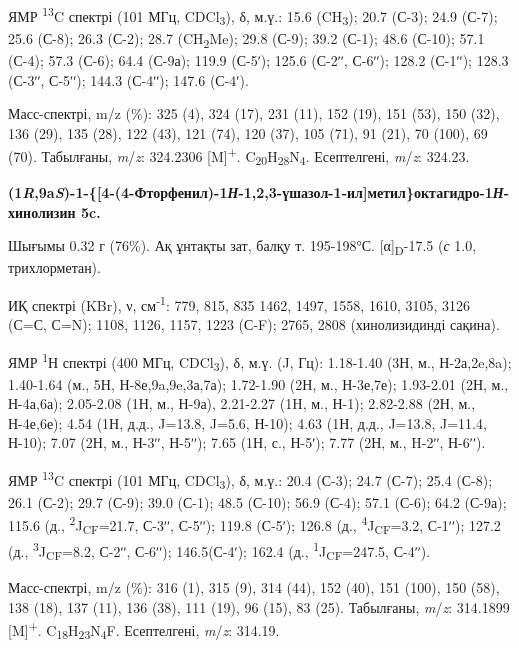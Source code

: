 ЯМР \textsuperscript{13}C спектрі (101 МГц, CDCl\textsubscript{3}), δ,
м.ү.: 15.6 (CH\textsubscript{3}); 20.7 (С-3); 24.9 (С-7); 25.6 (С-8);
26.3 (С-2); 28.7 (CH\textsubscript{2}Me); 29.8 (С-9); 39.2 (С-1); 48.6
(С-10); 57.1 (С-4); 57.3 (С-6); 64.4 (С-9а); 119.9 (С-5ʹ); 125.6 (С-2ʹʹ,
С-6ʹʹ); 128.2 (С-1ʹʹ); 128.3 (С-3ʹʹ, С-5ʹʹ); 144.3 (С-4ʹʹ); 147.6
(С-4ʹ).

Масс-спектрі, m/z (\%): 325 (4), 324 (17), 231 (11), 152 (19), 151 (53),
150 (32), 136 (29), 135 (28), 122 (43), 121 (74), 120 (37), 105 (71), 91
(21), 70 (100), 69 (70). Табылғаны, \emph{m}/\emph{z}: 324.2306
{[}M{]}\textsuperscript{+}.
C\textsubscript{20}H\textsubscript{28}N\textsubscript{4}. Есептелгені,
\emph{m}/\emph{z}: 324.23.

\textbf{(1\emph{R},9a\emph{S})-1-\{{[}4-(4-Фторфенил)-1\emph{Н}-1,2,3-үшазол-1-ил{]}метил\}октагидро-1\emph{Н}-хинолизин
5c.}

Шығымы 0.32 г (76\%). Ақ ұнтақты зат, балқу т. 195-198°С.
{[}α{]}\textsubscript{D}-17.5 (\emph{с} 1.0, трихлорметан).

ИҚ спектрі (KBr), ν, см\textsuperscript{-1}: 779, 815, 835 1462, 1497,
1558, 1610, 3105, 3126 (С=С, С=N); 1108, 1126, 1157, 1223 (С-F); 2765,
2808 (хинолизидинді сақина).

ЯМР \textsuperscript{1}Н спектрі (400 МГц, CDCl\textsubscript{3}), δ,
м.ү. (J, Гц): 1.18-1.40 (3Н, м., Н-2а,2e,8a); 1.40-1.64 (м., 5Н,
Н-8е,9a,9e,3а,7а); 1.72-1.90 (2Н, м., Н-3е,7е); 1.93-2.01 (2Н, м.,
Н-4а,6а); 2.05-2.08 (1Н, м., Н-9а), 2.21-2.27 (1H, м., Н-1); 2.82-2.88
(2Н, м., Н-4е,6е); 4.54 (1Н, д.д., J=13.8, J=5.6, Н-10); 4.63 (1Н, д.д.,
J=13.8, J=11.4, Н-10); 7.07 (2Н, м., Н-3ʹʹ, Н-5ʹʹ); 7.65 (1Н, с., Н-5ʹ);
7.77 (2Н, м., H-2ʹʹ, Н-6ʹʹ).

ЯМР \textsuperscript{13}C спектрі (101 МГц, CDCl\textsubscript{3}), δ,
м.ү.: 20.4 (С-3); 24.7 (С-7); 25.4 (С-8); 26.1 (С-2); 29.7 (С-9); 39.0
(С-1); 48.5 (С-10); 56.9 (С-4); 57.1 (С-6); 64.2 (С-9а); 115.6 (д.,
\textsuperscript{2}J\textsubscript{CF}=21.7, С-3ʹʹ, С-5ʹʹ); 119.8
(С-5ʹ); 126.8 (д., \textsuperscript{4}J\textsubscript{CF}=3.2, С-1ʹʹ);
127.2 (д., \textsuperscript{3}J\textsubscript{CF}=8.2, С-2ʹʹ, С-6ʹʹ);
146.5(С-4ʹ); 162.4 (д., \textsuperscript{1}J\textsubscript{CF}=247.5,
С-4ʹʹ).

Масс-спектрі, m/z (\%): 316 (1), 315 (9), 314 (44), 152 (40), 151 (100),
150 (58), 138 (18), 137 (11), 136 (38), 111 (19), 96 (15), 83 (25).
Табылғаны, \emph{m}/\emph{z}: 314.1899 {[}M{]}\textsuperscript{+}.
C\textsubscript{18}H\textsubscript{23}N\textsubscript{4}F. Есептелгені,
\emph{m}/\emph{z}: 314.19.

